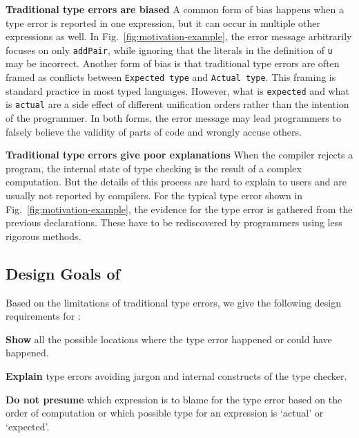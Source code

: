 \textbf{Traditional type errors are biased}
A common form of bias happens when a type error is reported in one expression, but it can occur in multiple other expressions as well. In Fig.~\ref{fig:motivation-example}, the error message arbitrarily focuses on only \texttt{addPair}, while ignoring that the literals in the definition of \texttt{u} may be incorrect. %
Another form of bias is that traditional type errors are often framed as conflicts between \texttt{Expected type} and \texttt{Actual type}. This framing is standard practice in most typed languages. However, what is \texttt{expected} and what is \texttt{actual} are a side effect of different unification orders rather than the intention of the programmer. In both forms, the error message may lead programmers to falsely believe the validity of parts of code and wrongly accuse others.

\textbf{Traditional type errors give poor explanations}
When the compiler rejects a program, the internal state of type checking is the result of a complex computation. But the details of this process are hard to explain to users and are usually not reported by compilers. For the typical type error shown in Fig.~\ref{fig:motivation-example}, the evidence for the type error is gathered from the previous declarations. These have to be rediscovered by programmers using less rigorous methods. 

\subsection{Design Goals of \chameleon{}}
Based on the limitations of traditional type errors, we give the following design requirements for \chameleon{}:

\noindent\textbf{Show} all the possible locations where the type error happened or could have happened.

\noindent\textbf{Explain} type errors avoiding jargon and internal constructs of the type checker.

\noindent\textbf{Do not presume} which expression is to blame for the type error based on the order of computation or which possible type for an expression is `actual' or `expected'.


